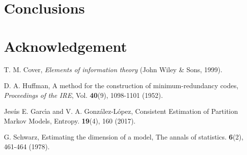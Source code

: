 \documentclass{aip-cp}
\begin{document}
\section{Conclusions}\label{conclu}
\section{Acknowledgement}




 \begin{thebibliography}{00}

 T. M. Cover, {\it{Elements of information theory}} (John Wiley \& Sons, 1999).

 D. A. Huffman, A method for the construction of minimum-redundancy codes, {\it{Proceedings of the IRE}}, Vol. {\bf{40}}(9), 1098-1101 (1952).




  Jes\'{u}s E. Garc\'{\i}a and V. A. Gonz\'alez-L\'opez, Consistent Estimation of Partition Markov Models, Entropy. {\bf{19}}(4), 160 (2017).


 G. Schwarz, Estimating the dimension of a model, The annals of statistics. {\bf{6}}(2), 461-464 (1978).



\end{thebibliography}
\end{document}
